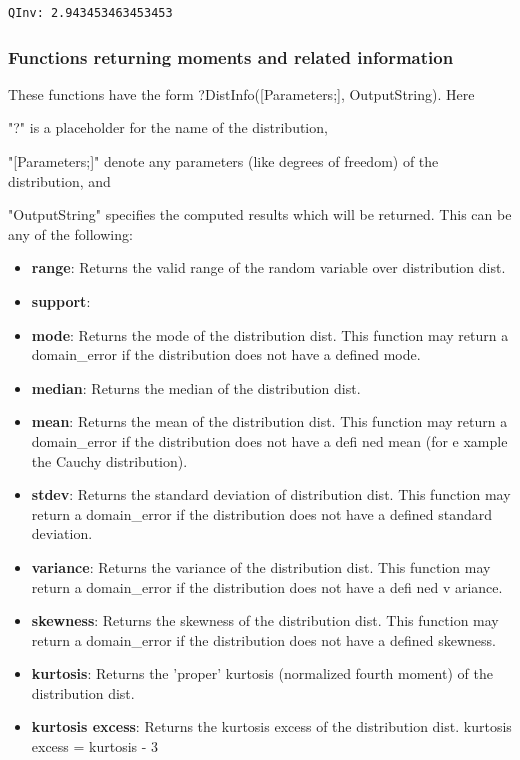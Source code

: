 \begin{verbatim}
QInv: 2.943453463453453
\end{verbatim}


\newpage
\subsubsection{Functions returning moments and related information}
\label{Functions returning moments and related information}
These functions have the form \textsf{?DistInfo([Parameters;], OutputString)}.
Here 

"?" is a placeholder for the name of the distribution, 

"[Parameters;]" denote any parameters (like degrees of freedom) of the distribution, and 

"OutputString" specifies the computed results which will be returned. This can be any of the following:

\begin{itemize}
	\item \textbf{range}: Returns the valid range of the random variable over distribution dist. 
	\item \textbf{support}: 	
	\item \textbf{mode}: Returns the mode of the distribution dist. This function may return a domain\_error if the distribution does not have a defined mode.
	\item \textbf{median}: Returns the median of the distribution dist.
	\item \textbf{mean}: Returns the mean of the distribution dist. This function may return a domain\_error if the distribution does not have a defi ned mean (for e xample the Cauchy distribution).
	\item \textbf{stdev}: Returns the standard deviation of distribution dist.
	This function may return a domain\_error if the distribution does not have a defined standard deviation.
	\item \textbf{variance}: Returns the variance of the distribution dist.
	This function may return a domain\_error if the distribution does not have a defi ned v ariance.
	\item \textbf{skewness}: Returns the skewness of the distribution dist.
	This function may return a domain\_error if the distribution does not have a defined skewness.
	\item \textbf{kurtosis}: Returns the 'proper' kurtosis (normalized fourth moment) of the distribution dist.
	\item \textbf{kurtosis excess}: Returns the kurtosis excess of the distribution dist. kurtosis excess = kurtosis - 3
\end{itemize}



